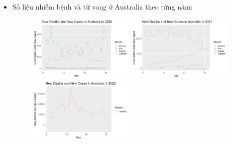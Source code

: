 \documentclass[a4paper]{article}
\theoremstyle{definition}
\begin{document}
\begin{enumerate}[i)]
\begin{enumerate}[1]
    \begin{itemize}
   \item{Số liệu nhiễm bệnh và tử vong ở Australia theo từng năm:}\\ 
     \begin{figure}[htp!]
    \includegraphics[width=0.48\textwidth]{Images/3.1v.png}
    \includegraphics[width=0.48\textwidth]{Images/3.2v.png}
    \includegraphics[width=0.48\textwidth]{Images/3.3v.png}
  \end{figure}
    \end{itemize}
    

\end{enumerate}
\end{enumerate}
\end{document}
